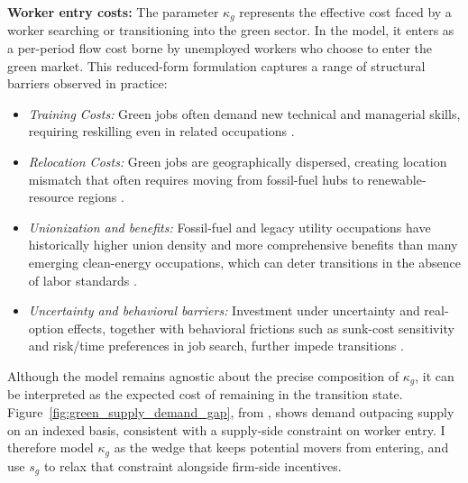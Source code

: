 \documentclass[preprint,12pt]{elsarticle}
\begin{document}
\medskip
\noindent\textbf{Worker entry costs:}
The parameter $\kappa_g$ represents the effective cost faced by a worker searching or transitioning into the green sector. In the model, it enters as a per-period flow cost borne by unemployed workers who choose to enter the green market. This reduced-form formulation captures a range of structural barriers observed in practice:
\begin{itemize}
  \item \textit{Training Costs:} Green jobs often demand new technical and managerial skills, requiring reskilling even in related occupations \citep{vona2018greenskills,consoli2016skills,bowen2018characterising}.
  \item \textit{Relocation Costs:} Green jobs are geographically dispersed, creating location mismatch that often requires moving from fossil-fuel hubs to renewable-resource regions \citep{lim2023location,greenspon2024matching,brookings2021uplift,vanatta2022siting}.
  \item \textit{Unionization and benefits:} Fossil-fuel and legacy utility occupations have historically higher union density and more comprehensive benefits than many emerging clean-energy occupations, which can deter transitions in the absence of labor standards \citep{muro2019clean,zabin2020highroad,zabin2021lessons}.
  \item \textit{Uncertainty and behavioral barriers:} Investment under uncertainty and real-option effects, together with behavioral frictions such as sunk-cost sensitivity and risk/time preferences in job search, further impede transitions \citep{dixit1994investment,arkes1985psychology,dellavigna2005jobsearch}.
\end{itemize}
Although the model remains agnostic about the precise composition of $\kappa_g$, it can be interpreted as the expected cost of remaining in the transition state. Figure~\ref{fig:green_supply_demand_gap}, from \citep{linkedin2024stocktake}, shows demand outpacing supply on an indexed basis, consistent with a supply-side constraint on worker entry. I therefore model $\kappa_g$ as the wedge that keeps potential movers from entering, and use $s_g$ to relax that constraint alongside firm-side incentives.
\end{document}
